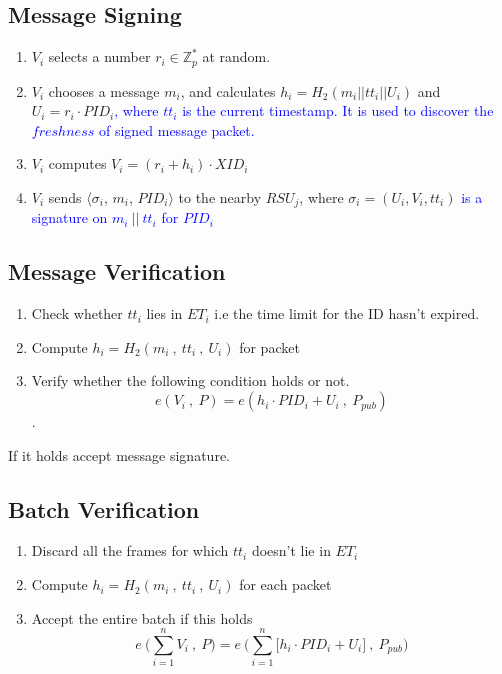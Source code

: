 \documentclass[10pt,journal,letterpaper]{IEEEtran}
\begin{document}
\subsection{Message Signing}
\begin{enumerate}[label=\textbf{(\arabic*).}]
\item $V_{i}$ selects a number $r_i \in \mathbb{Z}_{p}^{*}$ at random.
\item $V_{i}$ chooses a message $m_{i}$, and calculates $h_{i} = H_{2}(m_{i}||tt_{i}||U_i)$ and $U_i = r_{i}\cdot
PID_i$\textcolor{blue}{, where $tt_i$ is the current timestamp. It is used to discover the $freshness$  of signed message packet.}
\item $V_{i}$ computes $V_{i} = (r_{i}+h_i)\cdot XID_i$
\item $V_{i}$ sends $\langle\sigma_i$, $m_{i}$, $PID_i\rangle$ to the
nearby $RSU_{j}$, where $\sigma_i = (U_i, V_i, tt_i)$ \textcolor{blue}{is a signature on $m_i\: ||\: tt_i$ for $PID_i$}

\end{enumerate}

\subsection{Message Verification}
\begin{enumerate}
    \item Check whether $tt_i$ lies in $ET_i$ i.e the time limit for the ID hasn't expired.
    \item Compute $h_i = H_2(m_i\:,\:tt_i\:,\:U_i)$ for packet
    \item Verify whether the following condition holds or not. $$e(V_i\:,\:P) = e(h_i\cdot PID_i + U_i\:,\:P_{pub}) $$.
\end{enumerate}
If it holds accept message signature.

\subsection{Batch Verification}
\begin{enumerate}
    \item Discard all the frames for which $tt_i$ doesn't lie in $ET_i$
    \item Compute $h_i = H_2(m_i\:,\:tt_i\:,\:U_i)$ for each packet
    \item Accept the entire batch if this holds \\
    $$e\:\Bigg( \sum_{i=1}^{n}V_i\:,\:P \Bigg) = e\:\Bigg(\sum_{i=1}^{n} \big[ h_i\cdot PID_i + U_i \big]\:,\:P_{pub} \Bigg) $$
\end{enumerate}
\end{document}

